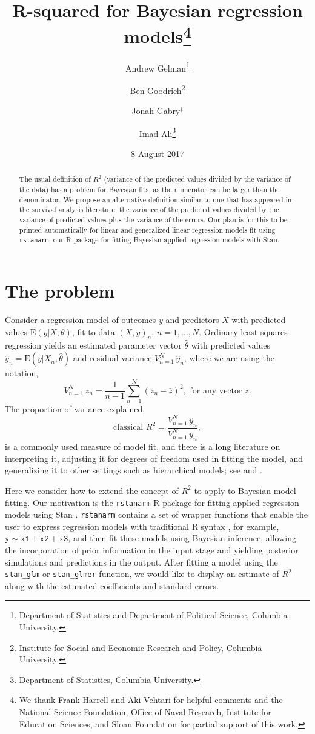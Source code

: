 \documentclass[11pt]{article}
\title{\bf R-squared for Bayesian regression models\footnote{
  We thank Frank Harrell and Aki Vehtari for helpful comments and the National Science Foundation,
  Office of Naval Research, Institute for Education Sciences, and Sloan Foundation
  for partial support of this work.
}\vspace{.1in}}
\author{Andrew Gelman\footnote{Department of Statistics and Department of Political Science, Columbia University.}
  \and Ben Goodrich\footnote{Institute for Social and Economic Research and Policy, Columbia University.}
  \and Jonah Gabry$^\ddagger$
  \and Imad Ali\footnote{Department of Statistics, Columbia University.
}\vspace{.1in}}
\date{8 August 2017\vspace{-.1in}}
\begin{document}
\sloppy
\maketitle
\thispagestyle{empty}

\begin{abstract}
The usual definition of $R^2$ (variance of the predicted values divided by the
variance of the data) has a problem for Bayesian fits, as the numerator can be
larger than the denominator.  We propose an alternative definition similar to
one that has appeared in the survival analysis literature:  the variance of the
predicted values divided by the variance of predicted values plus the variance 
of the errors. Our plan is for this to be printed automatically for linear and
generalized linear regression models fit using {\tt rstanarm}, our R package
for fitting Bayesian applied regression models with Stan.
\end{abstract}

\section{The problem}

Consider a regression model of outcomes $y$ and predictors $X$ with predicted
values $\mbox{E}(y|X,\theta)$, fit to data $(X,y)_n, \, n=1,\ldots,N$.  Ordinary
least squares regression yields an estimated parameter vector $\hat{\theta}$
with predicted values $\hat{y}_n = \mbox{E}(y | X_n, \hat{\theta})$ and residual
variance $V_{n=1}^N \,\hat{y}_n$, where we are using the notation,
%
$$
V_{n=1}^N \, z_n = \frac{1}{n-1}\sum_{n=1}^N (z_n - \bar{z})^2, \mbox{ for any vector }z.
$$
%
The proportion of variance explained,
%
\begin{equation}\label{rsq1}
\mbox{classical } R^2 = \frac{V_{n=1}^N \,\hat{y}_n}{V_{n=1}^N \,y_n},
\end{equation}
%
is a commonly used measure of model fit, and there is a long literature on
interpreting it, adjusting it for degrees of freedom used in fitting the model,
and generalizing it to other settings such as hierarchical models; see \cite{Xu2003}
and \cite{GelmanPardoe2006}.

Here we consider how to extend the concept of $R^2$ to apply to Bayesian model
fitting.  Our motivation is the {\tt rstanarm} R package
\citep{rstanarmRpackage} for fitting applied regression models using Stan
\citep{stan}. {\tt rstanarm} contains a set of wrapper functions that enable the
user to express regression models with traditional R syntax \citep{rcore}, 
for example, $\mathtt{y \sim x1 + x2 + x3}$, and then fit these models using 
Bayesian inference, allowing the incorporation
of prior information in the input stage and yielding posterior simulations and
predictions in the output.  After fitting a model using the \verb#stan_glm#
or \verb#stan_glmer# function, we would like to display an estimate of $R^2$
along with the estimated coefficients and standard errors.
\end{document}
